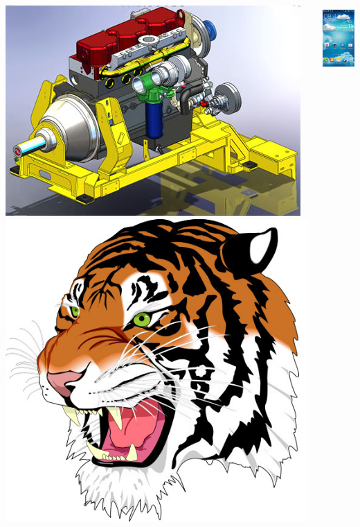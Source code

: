 \begin{frame}
\begin{columns}
\begin{column}{.2\textwidth}
\begin{center}
        \includegraphics[width=1.\textwidth]{images/solidworks.jpg} \\[5mm]
        \includegraphics[width=.8\textwidth]{images/tiger.jpg}
      \end{center}
    \end{column}
    \begin{column}{.1\textwidth}
      \begin{center}
        \includegraphics[height=2.5cm]{images/touchwiz.jpg}

\end{center}
\end{column}
\end{columns}
\end{frame}
